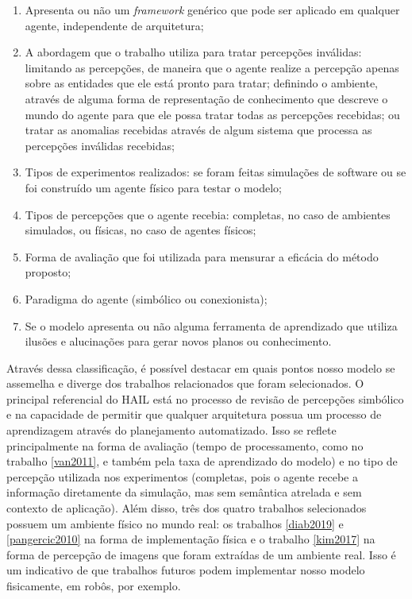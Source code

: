 \begin{enumerate}
    \item Apresenta ou não um \textit{framework} genérico que pode ser aplicado em qualquer agente, independente de arquitetura;
    \item A abordagem que o trabalho utiliza para tratar percepções inválidas: limitando as percepções, de maneira que o agente realize a percepção apenas sobre as entidades que ele está pronto para tratar; definindo o ambiente, através de alguma forma de representação de conhecimento que descreve o mundo do agente para que ele possa tratar todas as percepções recebidas; ou tratar as anomalias recebidas através de algum sistema que processa as percepções inválidas recebidas;
    \item Tipos de experimentos realizados: se foram feitas simulações de software ou se foi construído um agente físico para testar o modelo;
    \item Tipos de percepções que o agente recebia: completas, no caso de ambientes simulados, ou físicas, no caso de agentes físicos;
    \item Forma de avaliação que foi utilizada para mensurar a eficácia do método proposto;
    \item Paradigma do agente (simbólico ou conexionista);
    \item Se o modelo apresenta ou não alguma ferramenta de aprendizado que utiliza ilusões e alucinações para gerar novos planos ou conhecimento.
\end{enumerate}

Através dessa classificação, é possível destacar em quais pontos nosso modelo se assemelha e diverge dos trabalhos relacionados que foram selecionados. O principal referencial do HAIL está no processo de revisão de percepções simbólico e na capacidade de permitir que qualquer arquitetura possua um processo de aprendizagem através do planejamento automatizado. Isso se reflete principalmente na forma de avaliação (tempo de processamento, como no trabalho \ref{van2011}, e também pela taxa de aprendizado do modelo) e no tipo de percepção utilizada nos experimentos (completas, pois o agente recebe a informação diretamente da simulação, mas sem semântica atrelada e sem contexto de aplicação). Além disso, três dos quatro trabalhos selecionados possuem um ambiente físico no mundo real: os trabalhos \ref{diab2019} e \ref{pangercic2010} na forma de implementação física e o trabalho \ref{kim2017} na forma de percepção de imagens que foram extraídas de um ambiente real. Isso é um indicativo de que trabalhos futuros podem implementar nosso modelo fisicamente, em robôs, por exemplo.

